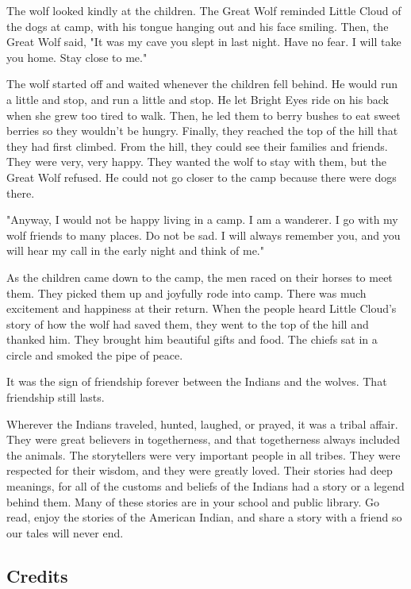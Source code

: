 The wolf looked kindly at the children. The Great Wolf reminded Little Cloud of the dogs at camp, with his tongue hanging out and his face smiling. Then, the Great Wolf said, "It was my cave you slept in last night. Have no fear. I will take you home. Stay close to me."

The wolf started off and waited whenever the children fell behind. He would run a little and stop, and run a little and stop. He let Bright Eyes ride on his back when she grew too tired to walk. Then, he led them to berry bushes to eat sweet berries so they wouldn't be hungry. Finally, they reached the top of the hill that they had first climbed. From the hill, they could see their families and friends. They were very, very happy. They wanted the wolf to stay with them, but the Great Wolf refused. He could not go closer to the camp because there were dogs there.

"Anyway, I would not be happy living in a camp. I am a wanderer. I go with my wolf friends to many places. Do not be sad. I will always remember you, and you will hear my call in the early night and think of me."

As the children came down to the camp, the men raced on their horses to meet them. They picked them up and joyfully rode into camp. There was much excitement and happiness at their return. When the people heard Little Cloud's story of how the wolf had saved them, they went to the top of the hill and thanked him. They brought him beautiful gifts and food. The chiefs sat in a circle and smoked the pipe of peace.

It was the sign of friendship forever between the Indians and the wolves. That friendship still lasts.

Wherever the Indians traveled, hunted, laughed, or prayed, it was a tribal affair. They were great believers in togetherness, and that togetherness always included the animals. The storytellers were very important people in all tribes. They were respected for their wisdom, and they were greatly loved. Their stories had deep meanings, for all of the customs and beliefs of the Indians had a story or a legend behind them. Many of these stories are in your school and public library. Go read, enjoy the stories of the American Indian, and share a story with a friend so our tales will never end.

\subsection{Credits}

